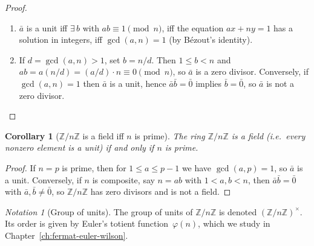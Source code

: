 \documentclass[12pt,a4paper,openany]{book}
\theoremstyle{definition}
\theoremstyle{plain}
\newtheorem{corollary}[definition]{Corollary}
\theoremstyle{remark}
\newtheorem{notation}[definition]{Notation}
\newcommand{\Z}{\mathbb{Z}}
\begin{document}
\begin{proof}
\leavevmode
\begin{enumerate}[label=(\roman*)]
  \item $\bar{a}$ is a unit iff $\exists\, b$ with $ab \equiv 1 \pmod{n}$,
        iff the equation $ax + ny = 1$ has a solution in integers,
        iff $\gcd(a,n) = 1$ (by Bézout's identity).
  \item If $d = \gcd(a,n) > 1$, set $b = n/d$.  Then $1 \le b < n$ and
        $ab = a(n/d) = (a/d)\cdot n \equiv 0 \pmod{n}$, so $\bar{a}$ is a zero
        divisor.  Conversely, if $\gcd(a,n)=1$ then $\bar{a}$ is a unit, hence
        $\bar{a}\bar{b} = \bar{0}$ implies $\bar{b} = \bar{0}$, so $\bar{a}$
        is not a zero divisor.
        \qedhere
\end{enumerate}
\end{proof}

\begin{corollary}[$\Z/n\Z$ is a field iff $n$ is prime]
\label{cor:ZpZ-field}
\index{Z/pZ@$\Z/p\Z$!field}
The ring $\Z/n\Z$ is a field (i.e.\ every nonzero element is a unit)
if and only if $n$ is prime.
\end{corollary}

\begin{proof}
If $n = p$ is prime, then for $1 \le a \le p-1$ we have $\gcd(a,p)=1$,
so $\bar{a}$ is a unit.  Conversely, if $n$ is composite, say $n = ab$
with $1 < a,b < n$, then $\bar{a}\bar{b} = \bar{0}$ with
$\bar{a}, \bar{b} \neq \bar{0}$, so $\Z/n\Z$ has zero divisors and
is not a field.
\end{proof}

\begin{notation}[Group of units]
\label{not:units-group}
\index{Z/nZ@$(\Z/n\Z)^\times$}
The group of units of $\Z/n\Z$ is denoted $(\Z/n\Z)^\times$.  Its order
is given by Euler's totient function~$\varphi(n)$, which we study
in Chapter~\ref{ch:fermat-euler-wilson}.
\end{notation}
\end{document}
